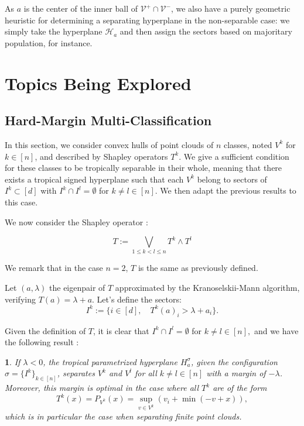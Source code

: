 \documentclass[oneside,english,a4paper]{amsart}
\numberwithin{equation}{section}
\numberwithin{figure}{section}
\theoremstyle{plain}
\theoremstyle{definition}
\theoremstyle{plain}
\newtheorem{prop}[thm]{\protect\propositionname}
\theoremstyle{remark}
\theoremstyle{plain}
\theoremstyle{definition}
\theoremstyle{definition}
\providecommand{\propositionname}{Proposition}
\begin{document}
As $a$ is the center of the inner ball of $\mathcal{V}^{+}\cap\mathcal{V}^{-}$,
we also have a purely geometric heuristic for determining a separating
hyperplane in the non-separable case: we simply take the hyperplane
$\mathcal{H}_{a}$ and then assign the sectors based on majoritary
population, for instance.


\section{Topics Being Explored}

\subsection{Hard-Margin Multi-Classification}

In this section, we consider convex hulls of point clouds of $n$
classes, noted $V^{k}$ for $k\in[n]$, and described by Shapley operators
$T^{k}$. We give a sufficient condition for these classes to be tropically
separable in their whole, meaning that there exists a tropical signed
hyperplane such that each $V^{k}$ belong to sectors of $I^{k}\subset[d]$
with $I^{k}\cap I^{l}=\emptyset$ for $k\ne l\in[n].$ We then adapt
the previous results to this case.

We now consider the Shapley operator :

\[
T:=\bigvee_{1\le k<l\le n}T^{k}\wedge T^{l}
\]

We remark that in the case $n=2$, $T$ is the same as previously
defined.

Let $(a,\lambda)$ the eigenpair of $T$ approximated by the Kranoselskii-Mann
algorithm, verifying $T(a)=\lambda+a$. Let's define the sectors:
\[
I^{k}:=\{i\in[d],\quad T^{k}(a)_{i}>\lambda+a_{i}\}.
\]

Given the definition of $T$, it is clear that $I^{k}\cap I^{l}=\emptyset$
for $k\ne l\in[n],$ and we have the following result :
\begin{prop}
If $\lambda<0$, the tropical parametrized hyperplane $H_{a}^{\sigma}$,
given the configuration $\sigma=\{I^{k}\}_{k\in[n]}$, separates $V^{k}$
and $V^{l}$ for all $k\ne l\in[n]$ with a margin of $-\lambda$.
Moreover, this margin is optimal in the case where all $T^{k}$ are
of the form
\[
T^{k}(x)=P_{V^{k}}(x)=\sup_{v\in V^{k}}\left(v_{i}+\min(-v+x)\right),
\]
 which is in particular the case when separating finite point clouds. 
\end{prop}
\end{document}
